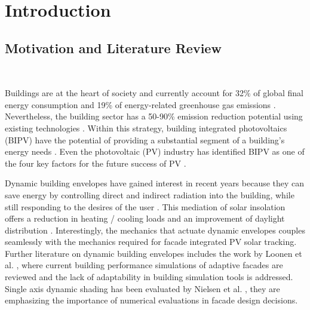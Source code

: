 \chapter{Introduction}


\section{Motivation and Literature Review}\
\label{ch:motivation}

	Buildings are at the heart of society and currently account for 32\% of global final energy consumption and 19\% of energy-related greenhouse gas emissions \cite{IPCC}. Nevertheless, the building sector has a 50-90\% emission reduction potential using existing technologies \cite{IPCC}. Within this strategy, building integrated photovoltaics (BIPV) have the potential of providing a substantial segment of a building's energy needs \cite{defaix2012technical}. Even the photovoltaic (PV) industry has identified BIPV as one of the four key factors for the future success of PV \cite{raugei2009life}. 



	Dynamic building envelopes have gained interest in recent years because they can save energy by controlling direct and indirect radiation into the building, while still responding to the desires of the user \cite{loonen2013climate}. This mediation of solar insolation offers a reduction in heating / cooling loads and an improvement of daylight distribution \cite{rossi2012adaptive}. Interestingly, the mechanics that actuate dynamic envelopes couples seamlessly with the mechanics required for facade integrated PV solar tracking. Further literature on dynamic building envelopes includes the work by Loonen et al. \cite{loonen16}, where current building performance simulations of adaptive facades are reviewed and the lack of adaptability in building simulation tools is addressed. Single axis dynamic shading has been evaluated by Nielsen et al. \cite{nielsen2011quantifying}, they are emphasizing the importance of numerical evaluations in facade design decisions. 

